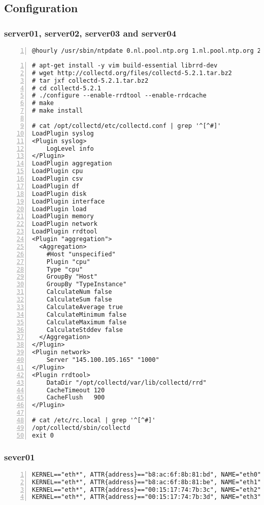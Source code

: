 \documentclass[Configuration]{subfiles}
\begin{document}
\newpage
\subsection{Configuration}
\label{sec:Configuration}

\subsubsection{server01, server02, server03 and server04}
\begin{lstlisting}[frame=single,caption=cronjob -l ,backgroundcolor=\color{gray},breaklines=true,numbers=left,]
@hourly /usr/sbin/ntpdate 0.nl.pool.ntp.org 1.nl.pool.ntp.org 2.nl.pool.ntp.org 3.nl.pool.ntp.org
\end{lstlisting}

\begin{lstlisting}[frame=single,caption=Collectd,backgroundcolor=\color{gray},breaklines=true,numbers=left,]
# apt-get install -y vim build-essential librrd-dev
# wget http://collectd.org/files/collectd-5.2.1.tar.bz2
# tar jxf collectd-5.2.1.tar.bz2
# cd collectd-5.2.1
# ./configure --enable-rrdtool --enable-rrdcache
# make 
# make install 

# cat /opt/collectd/etc/collectd.conf | grep '^[^#]'
LoadPlugin syslog
<Plugin syslog>
    LogLevel info
</Plugin>
LoadPlugin aggregation
LoadPlugin cpu
LoadPlugin csv
LoadPlugin df
LoadPlugin disk
LoadPlugin interface
LoadPlugin load
LoadPlugin memory
LoadPlugin network
LoadPlugin rrdtool
<Plugin "aggregation">
  <Aggregation>
    #Host "unspecified"
    Plugin "cpu"
    Type "cpu"
    GroupBy "Host"
    GroupBy "TypeInstance"
    CalculateNum false
    CalculateSum false
    CalculateAverage true
    CalculateMinimum false
    CalculateMaximum false
    CalculateStddev false
  </Aggregation>
</Plugin>
<Plugin network>
    Server "145.100.105.165" "1000"
</Plugin> 
<Plugin rrdtool>
    DataDir "/opt/collectd/var/lib/collectd/rrd"
    CacheTimeout 120
    CacheFlush   900
</Plugin>

# cat /etc/rc.local | grep '^[^#]'
/opt/collectd/sbin/collectd
exit 0
\end{lstlisting}

\subsubsection{sever01}

\begin{lstlisting}[frame=single,caption=/etc/udev/rules.d/70-persistent-net.rules,backgroundcolor=\color{gray},breaklines=true,numbers=left,]
KERNEL=="eth*", ATTR{address}=="b8:ac:6f:8b:81:bd", NAME="eth0"
KERNEL=="eth*", ATTR{address}=="b8:ac:6f:8b:81:be", NAME="eth1"
KERNEL=="eth*", ATTR{address}=="00:15:17:74:7b:3c", NAME="eth2"
KERNEL=="eth*", ATTR{address}=="00:15:17:74:7b:3d", NAME="eth3"
\end{lstlisting}
\end{document}
